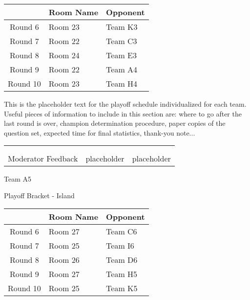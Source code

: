 \documentclass{article}%
\begin{document}
\vspace*{4pt}%
%
\begin{tabularx}{\textwidth}{|c|Y|Y|}%
\hline%
&Room Name&Opponent\\%
\hline%
Round 6&Room 23&Team K3\\%
Round 7&Room 22&Team C3\\%
Round 8&Room 24&Team E3\\%
Round 9&Room 22&Team A4\\%
Round 10&Room 23&Team H4\\%
\hline%
\end{tabularx}%
\vspace*{30pt}%
\linebreak%
This is the placeholder text for the playoff schedule individualized for each team. Useful pieces of information to include in this section are: where to go after the last round is over, champion determination procedure, paper copies of the question set, expected time for final statistics, thank{-}you note...%
\vspace*{30pt}%
\newline%
%
\begin{tabularx}{\textwidth}{YYY}%
  &  &  \\%
\\%
Moderator Feedback&placeholder&placeholder\\%
\end{tabularx}%
\newpage%
\begin{center}%
\begin{Huge}%
Team A5%
\end{Huge}%
\vspace*{12pt}%
\linebreak%
\begin{Large}%
Playoff Bracket {-} Island%
\end{Large}%
\end{center}%
\vspace*{4pt}%
%
\begin{tabularx}{\textwidth}{|c|Y|Y|}%
\hline%
&Room Name&Opponent\\%
\hline%
Round 6&Room 27&Team C6\\%
Round 7&Room 25&Team I6\\%
Round 8&Room 26&Team D6\\%
Round 9&Room 27&Team H5\\%
Round 10&Room 25&Team K5\\%
\hline%
\end{tabularx}%
\end{document}
